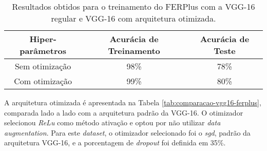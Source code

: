 \documentclass[
12pt,       %
openright,      %
oneside,      %
a4paper,      %
english,      %
french,       %
spanish,      %
brazil        %
]{abntex2}
\begin{document}
\begin{table}[H]
\centering
\caption{Resultados obtidos para o treinamento do FERPlus com a VGG-16 regular e VGG-16 com arquitetura otimizada.}
\label{tab:resultados-ferplus}
\begin{tabular}{@{}ccc@{}}
\toprule
\textbf{Hiper-parâmetros} & \textbf{Acurácia de Treinamento} & \textbf{Acurácia de Teste} \\ \midrule
Sem otimização            & 98\%              & 78\%               \\
Com otimização            & 99\%              & 80\%               \\ \bottomrule
\end{tabular}
\end{table}

A arquitetura otimizada é apresentada na Tabela \ref{tab:comparacao-vgg16-ferplus}, comparada lado a lado com a arquitetura padrão da VGG-16. O otimizador selecionou \textit{ReLu} como método ativação e optou por não utilizar \textit{data augmentation}. Para este \textit{dataset}, o otimizador selecionado foi o \textit{sgd}, padrão da arquitetura VGG-16, e a porcentagem de \textit{dropout} foi definida em 35\%.
\end{document}
